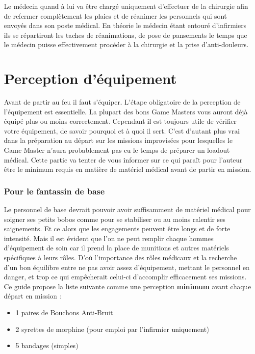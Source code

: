 \documentclass{article}
\begin{document}
		Le médecin quand à lui va être chargé uniquement d'effectuer de la chirurgie afin de refermer complètement les plaies et de réanimer les personnels qui sont envoyés dans son poste médical. En théorie le médecin étant entouré d'infirmiers ils se répartiront les taches de réanimations, de pose de pansements le temps que le médecin puisse effectivement procéder à la chirurgie et la prise d’anti-douleurs. %
		
	\part{Perception d'équipement}
		Avant de partir au feu il faut s'équiper. L'étape obligatoire de la perception de l'équipement est essentielle. La plupart des bons Game Masters vous auront déjà équipé plus ou moins correctement. Cependant il est toujours utile de vérifier votre équipement, de savoir pourquoi et à quoi il sert. C'est d'autant plus vrai dans la préparation au départ sur les missions improvisées pour lesquelles le Game Master n'aura probablement pas eu le temps de préparer un loadout médical. Cette partie va tenter de vous informer sur ce qui paraît pour l'auteur être le minimum requis en matière de matériel médical avant de partir en mission.
		
		\section{Pour le fantassin de base}
			Le personnel de base devrait pouvoir avoir suffisamment de matériel médical pour soigner ses petits bobos comme pour se stabiliser ou au moins ralentir ses saignements. Et ce alors que les engagements peuvent être longs et de forte intensité. Mais il est évident que l'on ne peut remplir chaque hommes d'équipement de soin car il prend la place de munitions et autres matériels spécifiques à leurs rôles. D'où l'importance des rôles médicaux et la recherche d'un bon équilibre entre ne pas avoir assez d'équipement, mettant le personnel en danger, et trop ce qui empêcherait celui-ci d'accomplir efficacement ses missions.\\
			Ce guide propose la liste suivante comme une perception \textbf{minimum} avant chaque départ en mission :
			\begin{itemize}
				\item 1 paires de Bouchons Anti-Bruit
				\item 2 syrettes de morphine (pour emploi par l'infirmier uniquement)
				\item 5 bandages (simples) %
			\end{itemize}  
			
\end{document}
